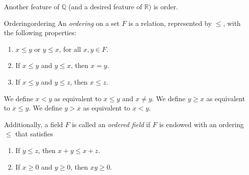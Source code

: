 Another feature of \(\mathbb{Q}\) (and a desired feature of \(\mathbb{R}\)) is order.

\begin{defn}{Ordering}{ordering}
	An \emph{ordering} on a set \(F\) is a relation, represented by \(\leq\), with the following properties:
	\begin{enumerate}
		\item \(x \leq y\) or \(y \leq x\), for all \(x, y \in F\).
		\item If \(x \leq y\) and \(y \leq x\), then \(x = y\).
		\item If \(x \leq y\) and \(y \leq z\), then \(x \leq z\).
	\end{enumerate}

	We define \(x < y\) as equivalent to \(x \leq y\) and \(x \neq y\).
	We define \(y \geq x\) as equivalent to \(x \leq y\).
	We define \(y > x\) as equivalent to \(x < y\).

	Additionally, a field \(F\) is called an \emph{ordered field} if \(F\) is endowed with an ordering \(\leq\) that satisfies
	\begin{enumerate}[resume]
		\item If \(y \leq z\), then \(x + y \leq x + z\).
		\item If \(x \geq 0\) and \(y \geq 0\), then \(xy \geq 0\).
	\end{enumerate}
\end{defn}
